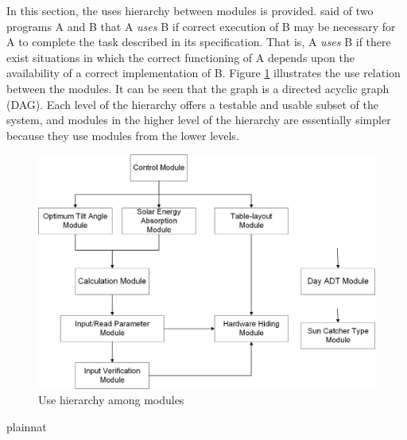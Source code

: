 \documentclass[12pt, titlepage]{article}
\begin{document}
In this section, the uses hierarchy between modules is
provided. \citet{Parnas1978} said of two programs A and B that A {\em uses} B
if correct execution of B may be necessary for A to complete the task described
in
its specification. That is, A {\em uses} B if there exist situations in which
the correct functioning of A depends upon the availability of a correct
implementation of B.  Figure \ref{FigUH} illustrates the use relation between
the modules. It can be seen that the graph is a directed acyclic graph
(DAG). Each level of the hierarchy offers a testable and usable subset of the
system, and modules in the higher level of the hierarchy are essentially
simpler because they use modules from the lower levels.

\begin{figure}[H]
	\center
  \includegraphics[scale=0.5]{Fig_Hierarchy.jpg}
 \caption{\label{FigUH} Use hierarchy among modules}
\end{figure}



 {plainnat}


\end{document}
